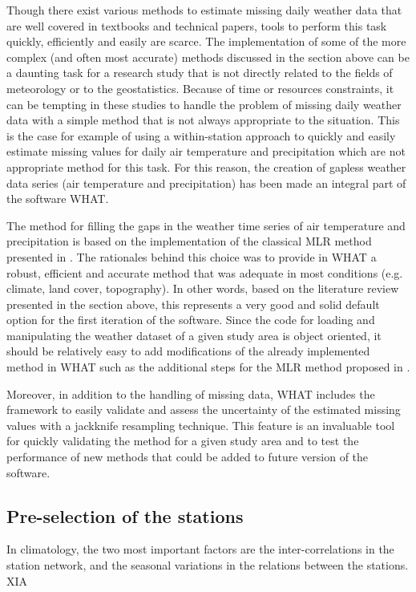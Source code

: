 \documentclass[WHATMANUAL.tex]{subfiles}
\begin{document}
Though there exist various methods to estimate missing daily weather data that are well covered in textbooks and technical papers, tools to perform this task quickly, efficiently and easily are scarce. The implementation of some of the more complex (and often most accurate) methods discussed in the section above can be a daunting task for a research study that is not directly related to the fields of meteorology or to the geostatistics. Because of time or resources constraints, it can be tempting in these studies to handle the problem of missing daily weather data with a simple method that is not always appropriate to the situation. This is the case for example of using a within-station approach to quickly and easily estimate missing values for daily air temperature and precipitation which are not appropriate method for this task. For this reason, the creation of gapless weather data series (air temperature and precipitation) has been made an integral part of the software WHAT.

The method for filling the gaps in the weather time series of air temperature and precipitation is based on the implementation of the classical MLR method presented in \cite{eischeid_creating_2000}.  The rationales behind this choice was to provide in WHAT a robust, efficient and accurate method that was adequate in most conditions (e.g. climate, land cover, topography). In other words, based on the literature review presented in the section above, this represents a very good and solid default option for the first iteration of the software. Since the code for loading and manipulating the weather dataset of a given study area is object oriented, it should be relatively easy to add modifications of the already implemented method in WHAT such as the additional steps for the MLR method proposed in \cite{simolo_improving_2010}.

Moreover, in addition to the handling of missing data, WHAT includes the framework to easily validate and assess the uncertainty of the estimated missing values with a jackknife resampling technique. This feature is an invaluable tool for quickly validating the method for a given study area and to test the performance of new methods that could be added to future version of the software.

\subsection{Pre-selection of the stations}
In climatology, the two most important factors are the inter-correlations in the station network, and the seasonal variations in the relations between the stations. {XIA}
\end{document}
